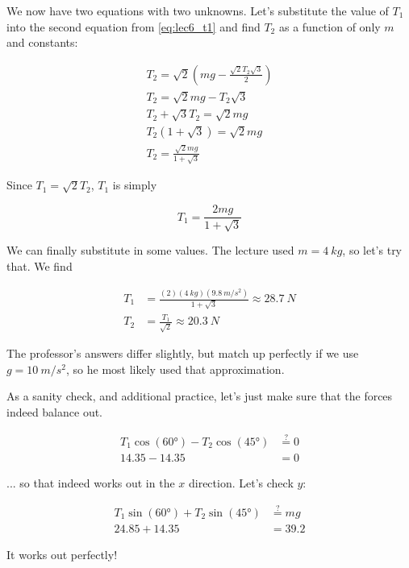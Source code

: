 We now have two equations with two unknowns. Let's substitute the value of $T_1$ into the second equation from \eqref{eq:lec6_t1} and find $T_2$ as a function of only $m$ and constants:

\begin{align}
T_2 = \sqrt{2}\left(m g - \frac{\sqrt{2} T_2 \sqrt{3}}{2}\right)\\
T_2 = \sqrt{2} m g - T_2 \sqrt{3}\\
T_2 + \sqrt{3} T_2 = \sqrt{2} m g\\
T_2 (1 + \sqrt{3}) = \sqrt{2} m g\\
T_2 = \frac{\sqrt{2} m g}{1 + \sqrt{3}}
\end{align}

Since $T_1 = \sqrt{2} T_2$, $T_1$ is simply

\begin{equation}
T_1 = \frac{2 m g}{1 + \sqrt{3}}
\end{equation}

We can finally substitute in some values. The lecture used $m = \SI{4}{kg}$, so let's try that. We find

\begin{align}
T_1 &= \frac{(2)(\SI{4}{kg})(\SI{9.8}{m/s^2})}{1 + \sqrt{3}} \approx \SI{28.7}{N}\\
T_2 &= \frac{T_1}{\sqrt{2}} \approx \SI{20.3}{N}
\end{align}

The professor's answers differ slightly, but match up perfectly if we use $g = \SI{10}{m/s^2}$, so he most likely used that approximation.

As a sanity check, and additional practice, let's just make sure that the forces indeed balance out.

\begin{align}
T_1 \cos(\ang{60}) - T_2 \cos(\ang{45}) &\overset{?}{=} 0\\
14.35 - 14.35 &= 0
\end{align}

... so that indeed works out in the $x$ direction. Let's check $y$:

\begin{align}
T_1 \sin(\ang{60}) + T_2 \sin(\ang{45}) &\overset{?}{=} m g\\
24.85 + 14.35 &= 39.2
\end{align}

It works out perfectly!

